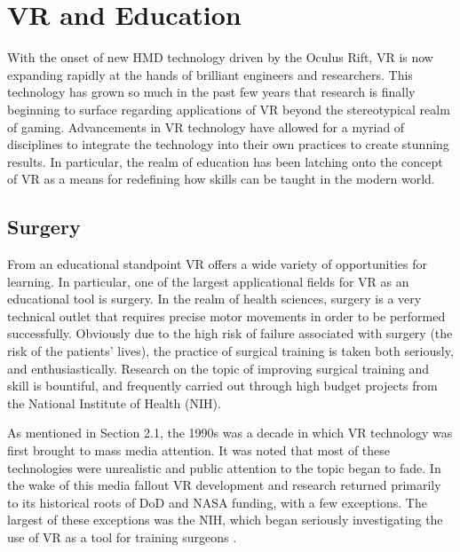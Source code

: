 \chapter{VR and Education}
\label{chap:vreducation}

With the onset of new HMD technology driven by the Oculus Rift, VR is now expanding rapidly at the hands of brilliant engineers and researchers. This technology has grown so much in the past few years that research is finally beginning to surface regarding applications of VR beyond the stereotypical realm of gaming. Advancements in VR technology have allowed for a myriad of disciplines to integrate the technology into their own practices to create stunning results. In particular, the realm of education has been latching onto the concept of VR as a means for redefining how skills can be taught in the modern world. 

\section{Surgery}
\label{sec:surgery}

From an educational standpoint VR offers a wide variety of opportunities for learning. In particular, one of the largest applicational fields for VR as an educational tool is surgery. In the realm of health sciences, surgery is a very technical outlet that requires precise motor movements in order to be performed successfully. Obviously due to the high risk of failure associated with surgery (the risk of the patients' lives), the practice of surgical training is taken both seriously, and enthusiastically. Research on the topic of improving surgical training and skill is bountiful, and frequently carried out through high budget projects from the National Institute of Health (NIH).

As mentioned in Section 2.1, the 1990s was a decade in which VR technology was first brought to mass media attention. It was noted that most of these technologies were unrealistic and public attention to the topic began to fade. In the wake of this media fallout VR development and research returned primarily to its historical roots of DoD and NASA funding, with a few exceptions. The largest of these exceptions was the NIH, which began seriously investigating the use of VR as a tool for training surgeons \cite{soriano_systematic_2011}. 

